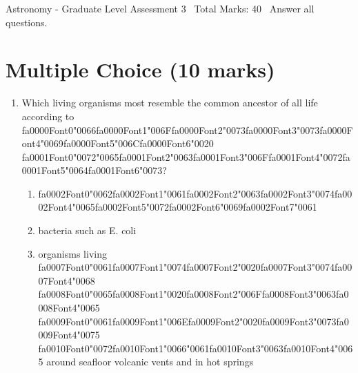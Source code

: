 \documentclass[12pt]{article}
\begin{document}
\begin{center}
Astronomy - Graduate Level Assessment 3 \
Total Marks: 40 \
Answer all questions.
\end{center}

\section*{Multiple Choice (10 marks)}
\begin{enumerate}[label=\arabic*.]
\item Which living organisms most resemble the common ancestor of all life according to {\csname fa0000Font0\endcsname\char"0066}{\csname fa0000Font1\endcsname\char"006F}{\csname fa0000Font2\endcsname\char"0073}{\csname fa0000Font3\endcsname\char"0073}{\csname fa0000Font4\endcsname\char"0069}{\csname fa0000Font5\endcsname\char"006C}{\csname fa0000Font6\endcsname\char"0020}
{\csname fa0001Font0\endcsname\char"0072}{\char"0065}{\csname fa0001Font2\endcsname\char"0063}{\csname fa0001Font3\endcsname\char"006F}{\csname fa0001Font4\endcsname\char"0072}{\csname fa0001Font5\endcsname\char"0064}{\csname fa0001Font6\endcsname\char"0073}?
\begin{enumerate}[label=(\alph*)]
    \item {\csname fa0002Font0\endcsname\char"0062}{\csname fa0002Font1\endcsname\char"0061}{\csname fa0002Font2\endcsname\char"0063}{\csname fa0002Font3\endcsname\char"0074}{\csname fa0002Font4\endcsname\char"0065}{\csname fa0002Font5\endcsname\char"0072}{\csname fa0002Font6\endcsname\char"0069}{\csname fa0002Font7\endcsname\char"0061}
    \item bacteria such as E. coli
    \item organisms living {\csname fa0007Font0\endcsname\char"0061}{\csname fa0007Font1\endcsname\char"0074}{\csname fa0007Font2\endcsname\char"0020}{\csname fa0007Font3\endcsname\char"0074}{\csname fa0007Font4\endcsname\char"0068} {\csname fa0008Font0\endcsname\char"0065}{\csname fa0008Font1\endcsname\char"0020}{\csname fa0008Font2\endcsname\char"006F}{\csname fa0008Font3\endcsname\char"0063}{\csname fa0008Font4\endcsname\char"0065} {\csname fa0009Font0\endcsname\char"0061}{\csname fa0009Font1\endcsname\char"006E}{\csname fa0009Font2\endcsname\char"0020}{\csname fa0009Font3\endcsname\char"0073}{\csname fa0009Font4\endcsname\char"0075} {\csname fa0010Font0\endcsname\char"0072}{\csname fa0010Font1\endcsname\char"0066}{\char"0061}{\csname fa0010Font3\endcsname\char"0063}{\csname fa0010Font4\endcsname\char"0065} around seafloor volcanic vents and in hot springs

\end{enumerate}
\end{enumerate}
\end{document}

